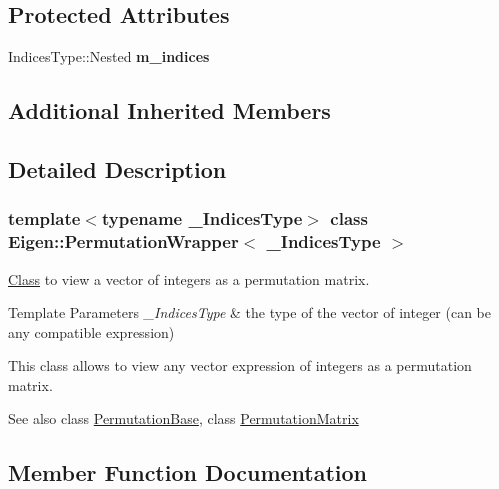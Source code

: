 \subsection*{Protected Attributes}
\begin{DoxyCompactItemize}
\item 
\mbox{\label{class_eigen_1_1_permutation_wrapper_ad8177189015eeb9e3c273af7def255b9}} 
Indices\+Type\+::\+Nested {\bfseries m\+\_\+indices}
\end{DoxyCompactItemize}
\subsection*{Additional Inherited Members}


\subsection{Detailed Description}
\subsubsection*{template$<$typename \+\_\+\+Indices\+Type$>$\newline
class Eigen\+::\+Permutation\+Wrapper$<$ \+\_\+\+Indices\+Type $>$}

\mbox{\hyperlink{struct_class}{Class}} to view a vector of integers as a permutation matrix. 


\begin{DoxyTemplParams}{Template Parameters}
{\em \+\_\+\+Indices\+Type} & the type of the vector of integer (can be any compatible expression)\\
\hline
\end{DoxyTemplParams}
This class allows to view any vector expression of integers as a permutation matrix.

\begin{DoxySeeAlso}{See also}
class \mbox{\hyperlink{class_eigen_1_1_permutation_base}{Permutation\+Base}}, class \mbox{\hyperlink{class_eigen_1_1_permutation_matrix}{Permutation\+Matrix}} 
\end{DoxySeeAlso}


\subsection{Member Function Documentation}
\mbox{\label{class_eigen_1_1_permutation_wrapper_a88ae93cc14c136b2eec4a286b4c10c34}} 
